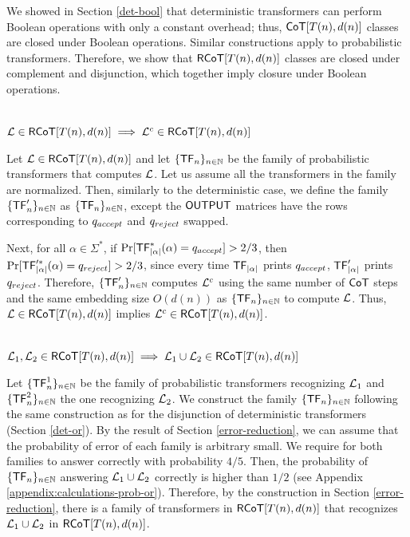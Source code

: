 We showed in Section \ref{det-bool} that deterministic transformers can perform Boolean operations with only a constant overhead; thus, $\mathsf{CoT}[T(n), d(n)]$ classes are closed under Boolean operations.
Similar constructions apply to probabilistic transformers.
Therefore, we show that $\mathsf{RCoT}[T(n), d(n)]$ classes are closed under complement and disjunction, which together imply closure under Boolean operations.

\bigskip

\begin{theorem}
    \leavevmode\\
    \indent $\mathcal{L} \in \mathsf{RCoT}[T(n), d(n)] \implies \mathcal{L}^c \in \mathsf{RCoT}[T(n), d(n)]$
\end{theorem}

Let $\mathcal{L} \in \mathsf{RCoT}[T(n), d(n)]$ and let $\{\mathsf{TF}_n\}_{n \in \mathbb{N}}$ be the family of probabilistic transformers that computes $\mathcal{L}$.
Let us assume all the transformers in the family are normalized.
Then, similarly to the deterministic case, we define the family $\{\mathsf{TF}'_n\}_{n \in \mathbb{N}}$ as $\{\mathsf{TF}_n\}_{n \in \mathbb{N}}$, except the $\mathsf{OUTPUT}$ matrices have the rows corresponding to $q_{accept}$ and $q_{reject}$ swapped.

Next, for all $\alpha \in \Sigma^*$, if $\Pr[\mathsf{TF}_{|\alpha|}^*(\alpha) = q_{accept}] > 2/3$, then $\Pr[\mathsf{TF}'^*_{|\alpha|}(\alpha) = q_{reject}] > 2/3$, since every time $\mathsf{TF}_{|\alpha|}$ prints $q_{accept}$, $\mathsf{TF}'_{|\alpha|}$ prints $q_{reject}$.
Therefore, $\{\mathsf{TF}'_n\}_{n \in \mathbb{N}}$ computes $\mathcal{L}^c$ using the same number of $\mathsf{CoT}$ steps and the same embedding size $O(d(n))$ as $\{\mathsf{TF}_n\}_{n \in \mathbb{N}}$ to compute $\mathcal{L}$.
Thus, $\mathcal{L} \in \mathsf{RCoT}[T(n), d(n)]$ implies $\mathcal{L}^c \in \mathsf{RCoT}[T(n), d(n)]$.


\bigskip

\begin{theorem}
    \leavevmode\\
    \indent $\mathcal{L}_1, \mathcal{L}_2 \in \mathsf{RCoT}[T(n), d(n)] \implies \mathcal{L}_1 \cup \mathcal{L}_2 \in \mathsf{RCoT}[T(n), d(n)]$
\end{theorem}

Let $\{\mathsf{TF}^1_n\}_{n \in \mathbb{N}}$ be the family of probabilistic transformers recognizing $\mathcal{L}_1$ and $\{\mathsf{TF}^2_n\}_{n \in \mathbb{N}}$ the one recognizing $\mathcal{L}_2$.
We construct the family $\{\mathsf{TF}_n\}_{n \in \mathbb{N}}$ following the same construction as for the disjunction of deterministic transformers (Section \ref{det-or}).
By the result of Section \ref{error-reduction}, we can assume that the probability of error of each family is arbitrary small.
We require for both families to answer correctly with probability $4/5$.
Then, the probability of $\{\mathsf{TF}_n\}_{n \in \mathbb{N}}$ answering $\mathcal{L}_1 \cup \mathcal{L}_2$ correctly is higher than $1/2$ (see Appendix \ref{appendix:calculations-prob-or}).
Therefore, by the construction in Section \ref{error-reduction}, there is a family of transformers in $\mathsf{RCoT}[T(n), d(n)]$ that recognizes $\mathcal{L}_1 \cup \mathcal{L}_2$ in $\mathsf{RCoT}[T(n), d(n)]$.